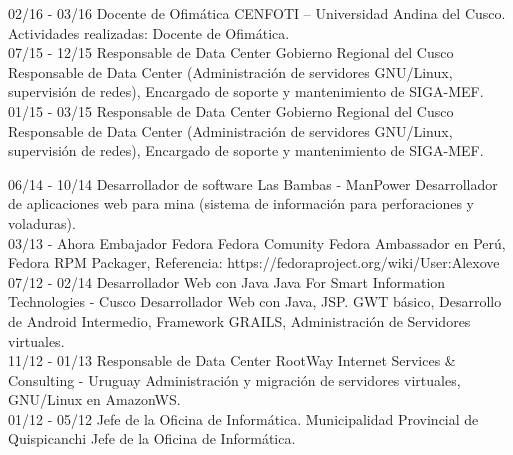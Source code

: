 \documentclass[]{friggeri-cv}
\begin{document}
\begin{entrylist}
    \entry
    {02/16 - 03/16}
    {Docente de Ofim\'atica}
    {CENFOTI – Universidad Andina del Cusco.}
    {Actividades realizadas: Docente de Ofim\'atica.\\}
    \entry
    {07/15 - 12/15}
    {Responsable de Data Center}
    {Gobierno Regional del Cusco}
    {Responsable de Data Center (Administraci\'on de servidores GNU/Linux, supervisi\'on de redes), Encargado de
    soporte y mantenimiento de SIGA-MEF.\\}
    \entry
    {01/15 - 03/15}
    {Responsable de Data Center}
    {Gobierno Regional del Cusco}
    {Responsable de Data Center (Administraci\'on de servidores GNU/Linux, supervisi\'on de redes), Encargado de
    soporte y mantenimiento de SIGA-MEF.\\}

    \entry
    {06/14 - 10/14}
    {Desarrollador de software}
    {Las Bambas - ManPower}
    {Desarrollador de aplicaciones web para mina (sistema de informaci\'on para perforaciones y voladuras).\\}
    \entry
    {03/13 - Ahora}
    {Embajador Fedora}
    {Fedora Comunity}
    {Fedora Ambassador en Per\'u, Fedora RPM Packager, Referencia{:} https{:}//fedoraproject.org/wiki/User{:}Alexove\\}
    \entry
    {07/12 - 02/14}
    {Desarrollador Web con Java}
    {Java For Smart Information Technologies - Cusco}
    {Desarrollador Web con Java, JSP. GWT b\'asico, Desarrollo de Android Intermedio, Framework GRAILS, Administraci\'on de Servidores virtuales.\\}
    \entry
    {11/12 - 01/13}
    {Responsable de Data Center}
    {{RootWay Internet Services \& Consulting - Uruguay}}
    {{Administraci\'on y migraci\'on de servidores virtuales, GNU/Linux en AmazonWS. \\ }}
    \entry
    {01/12 - 05/12}
    {Jefe de la Oficina de Inform\'atica.}
    {Municipalidad Provincial de Quispicanchi}
    {Jefe de la Oficina de Inform\'atica.\\}
\end{entrylist}
\end{document}
